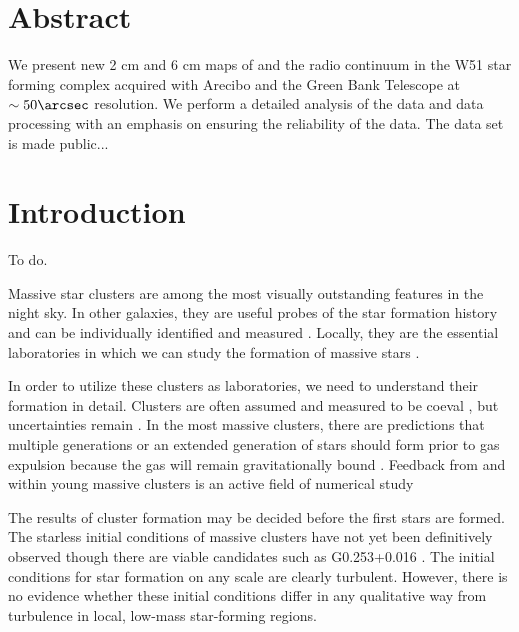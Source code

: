

%

\section{Abstract}
We present new 2 cm and 6 cm maps of \formaldehyde and the radio continuum in
the W51 star forming complex acquired with Arecibo and the Green Bank Telescope
at $\sim50\arcsec$ resolution.
We perform a detailed analysis of the data and data processing with an emphasis on
ensuring the reliability of the data.
The data set is made public...


\section{Introduction}
To do.

Massive star clusters are among the most visually outstanding features in the
night sky.  In other galaxies, they are useful probes of the star formation history
and can be individually identified and measured \citep{Bastian2008a}.  Locally,
they are the essential laboratories in which we can study the formation of massive
stars \citep{Davies2012a}.

In order to utilize these clusters as laboratories, we need to understand their
formation in detail.  Clusters are often assumed and measured to be coeval
\citep[e.g.][]{Kudryavtseva2012a}, but uncertainties remain \citep{Beccari2010a}.
In the most massive clusters, there are predictions that multiple generations
or an extended generation of stars should form prior to gas expulsion because
the gas will remain gravitationally bound \citep{Bressert2012a}.   Feedback from
and within young massive clusters is an active field of numerical study
\citep{Rogers2013a,Dale2013a,Dale2012a,Dale2008a,Dale2005a,Parker2013a,Myers2014a,Krumholz2014a}

The results of cluster formation may be decided before the first stars are
formed.  The starless initial conditions of massive clusters have not yet been
definitively observed \citep{Ginsburg2012a} though there are viable candidates
such as G0.253+0.016 \citep{Longmore2012b}.  The initial conditions for star
formation on any scale are clearly turbulent.  However, there is no evidence
whether these initial conditions differ in any qualitative way from turbulence
in local, low-mass star-forming regions.



